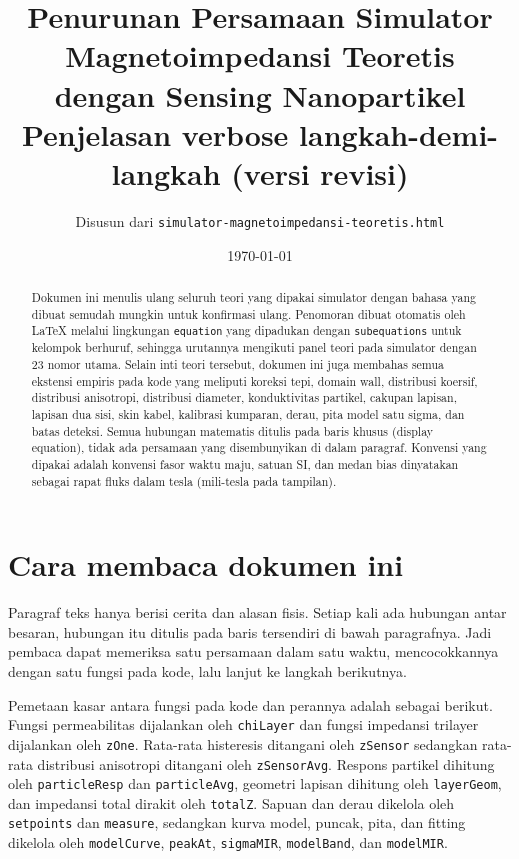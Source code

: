 \documentclass[a4paper,11pt]{article}
\title{Penurunan Persamaan Simulator Magnetoimpedansi Teoretis\\dengan Sensing Nanopartikel\\{\normalsize Penjelasan verbose langkah-demi-langkah (versi revisi)}}
\author{Disusun dari \texttt{simulator-magnetoimpedansi-teoretis.html}}
\date{\today}
\begin{document}
\maketitle

\begin{abstract}
Dokumen ini menulis ulang seluruh teori yang dipakai simulator dengan bahasa
yang dibuat semudah mungkin untuk konfirmasi ulang.
Penomoran dibuat otomatis oleh LaTeX melalui lingkungan
\texttt{equation} yang dipadukan dengan \texttt{subequations}
untuk kelompok berhuruf, sehingga urutannya mengikuti panel teori
pada simulator dengan 23 nomor utama. Selain inti teori tersebut,
dokumen ini juga membahas semua ekstensi empiris pada kode yang meliputi
koreksi tepi, domain wall, distribusi koersif, distribusi anisotropi,
distribusi diameter, konduktivitas partikel, cakupan lapisan,
lapisan dua sisi, skin kabel, kalibrasi kumparan, derau,
pita model satu sigma, dan batas deteksi.
Semua hubungan matematis ditulis pada baris khusus
(display equation), tidak ada persamaan yang disembunyikan
di dalam paragraf.
Konvensi yang dipakai adalah konvensi fasor waktu maju,
satuan SI, dan medan bias dinyatakan sebagai rapat fluks
dalam tesla (mili-tesla pada tampilan).
\end{abstract}

\tableofcontents
\newpage

\section{Cara membaca dokumen ini}
Paragraf teks hanya berisi cerita dan alasan fisis.
Setiap kali ada hubungan antar besaran, hubungan itu
ditulis pada baris tersendiri di bawah paragrafnya.
Jadi pembaca dapat memeriksa satu persamaan dalam satu waktu,
mencocokkannya dengan satu fungsi pada kode,
lalu lanjut ke langkah berikutnya.

Pemetaan kasar antara fungsi pada kode dan perannya adalah sebagai berikut.
Fungsi permeabilitas dijalankan oleh \texttt{chiLayer} dan fungsi impedansi
trilayer dijalankan oleh \texttt{zOne}. Rata-rata histeresis ditangani oleh
\texttt{zSensor} sedangkan rata-rata distribusi anisotropi ditangani oleh
\texttt{zSensorAvg}. Respons partikel dihitung oleh \texttt{particleResp}
dan \texttt{particleAvg}, geometri lapisan dihitung oleh \texttt{layerGeom},
dan impedansi total dirakit oleh \texttt{totalZ}. Sapuan dan derau dikelola
oleh \texttt{setpoints} dan \texttt{measure}, sedangkan kurva model, puncak,
pita, dan fitting dikelola oleh \texttt{modelCurve}, \texttt{peakAt},
\texttt{sigmaMIR}, \texttt{modelBand}, dan \texttt{modelMIR}.
\end{document}
